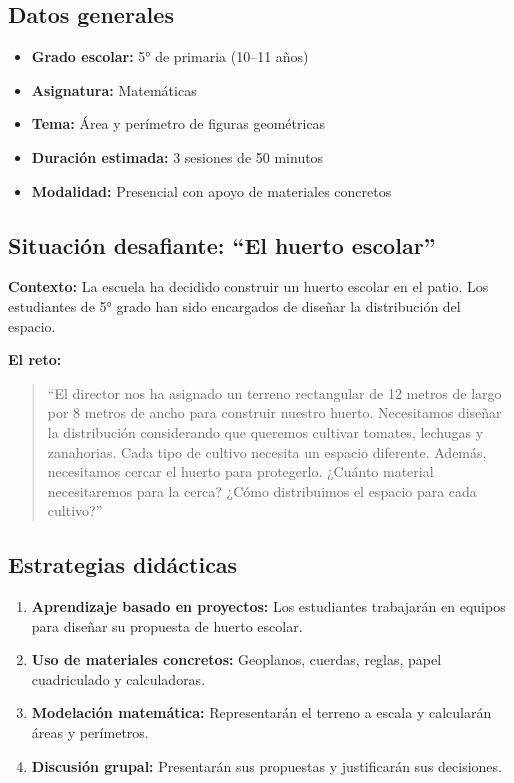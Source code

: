 \documentclass[spanish,letterpaper,oneside]{article}
\begin{document}
\begin{propuestabox}
\subsection{Datos generales}

\begin{itemize}
  \item \textbf{Grado escolar:} 5° de primaria (10--11 años)
  \item \textbf{Asignatura:} Matemáticas
  \item \textbf{Tema:} Área y perímetro de figuras geométricas
  \item \textbf{Duración estimada:} 3 sesiones de 50 minutos
  \item \textbf{Modalidad:} Presencial con apoyo de materiales concretos
\end{itemize}

\subsection{Situación desafiante: ``El huerto escolar''}

\textbf{Contexto:} La escuela ha decidido construir un huerto escolar en el patio. Los estudiantes de 5° grado han sido encargados de diseñar la distribución del espacio.

\textbf{El reto:}
\begin{quote}
``El director nos ha asignado un terreno rectangular de 12 metros de largo por 8 metros de ancho para construir nuestro huerto. Necesitamos diseñar la distribución considerando que queremos cultivar tomates, lechugas y zanahorias. Cada tipo de cultivo necesita un espacio diferente. Además, necesitamos cercar el huerto para protegerlo. ¿Cuánto material necesitaremos para la cerca? ¿Cómo distribuimos el espacio para cada cultivo?''
\end{quote}

\subsection{Estrategias didácticas}

\begin{enumerate}
  \item \textbf{Aprendizaje basado en proyectos:} Los estudiantes trabajarán en equipos para diseñar su propuesta de huerto escolar.
  \item \textbf{Uso de materiales concretos:} Geoplanos, cuerdas, reglas, papel cuadriculado y calculadoras.
  \item \textbf{Modelación matemática:} Representarán el terreno a escala y calcularán áreas y perímetros.
  \item \textbf{Discusión grupal:} Presentarán sus propuestas y justificarán sus decisiones.
\end{enumerate}


\end{propuestabox}
\end{document}
